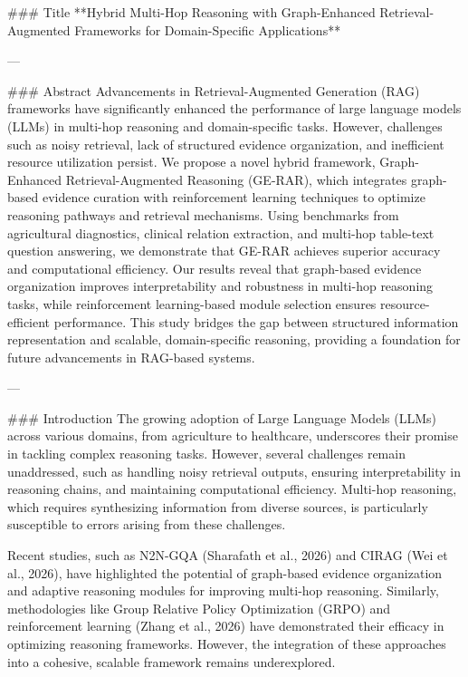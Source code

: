 ### Title  
**Hybrid Multi-Hop Reasoning with Graph-Enhanced Retrieval-Augmented Frameworks for Domain-Specific Applications**

---

### Abstract  
Advancements in Retrieval-Augmented Generation (RAG) frameworks have significantly enhanced the performance of large language models (LLMs) in multi-hop reasoning and domain-specific tasks. However, challenges such as noisy retrieval, lack of structured evidence organization, and inefficient resource utilization persist. We propose a novel hybrid framework, Graph-Enhanced Retrieval-Augmented Reasoning (GE-RAR), which integrates graph-based evidence curation with reinforcement learning techniques to optimize reasoning pathways and retrieval mechanisms. Using benchmarks from agricultural diagnostics, clinical relation extraction, and multi-hop table-text question answering, we demonstrate that GE-RAR achieves superior accuracy and computational efficiency. Our results reveal that graph-based evidence organization improves interpretability and robustness in multi-hop reasoning tasks, while reinforcement learning-based module selection ensures resource-efficient performance. This study bridges the gap between structured information representation and scalable, domain-specific reasoning, providing a foundation for future advancements in RAG-based systems.

---

### Introduction  
The growing adoption of Large Language Models (LLMs) across various domains, from agriculture to healthcare, underscores their promise in tackling complex reasoning tasks. However, several challenges remain unaddressed, such as handling noisy retrieval outputs, ensuring interpretability in reasoning chains, and maintaining computational efficiency. Multi-hop reasoning, which requires synthesizing information from diverse sources, is particularly susceptible to errors arising from these challenges.  

Recent studies, such as N2N-GQA (Sharafath et al., 2026) and CIRAG (Wei et al., 2026), have highlighted the potential of graph-based evidence organization and adaptive reasoning modules for improving multi-hop reasoning. Similarly, methodologies like Group Relative Policy Optimization (GRPO) and reinforcement learning (Zhang et al., 2026) have demonstrated their efficacy in optimizing reasoning frameworks. However, the integration of these approaches into a cohesive, scalable framework remains underexplored.  

